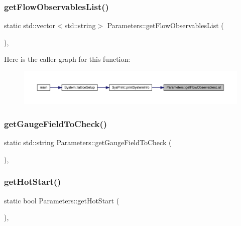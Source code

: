 \subsubsection{\texorpdfstring{getFlowObservablesList()}{getFlowObservablesList()}}
{\footnotesize\ttfamily static std\+::vector$<$std\+::string$>$ Parameters\+::get\+Flow\+Observables\+List (\begin{DoxyParamCaption}{ }\end{DoxyParamCaption})\hspace{0.3cm}{\ttfamily [inline]}, {\ttfamily [static]}}

Here is the caller graph for this function\+:
\nopagebreak
\begin{figure}[H]
\begin{center}
\leavevmode
\includegraphics[width=350pt]{class_parameters_a7f1edc3384a46b6e4fc5e380a8fe6d41_icgraph}
\end{center}
\end{figure}
\mbox{\label{class_parameters_ad6dea2bb6e91a1ca4fb5e20216b40039}} 
\subsubsection{\texorpdfstring{getGaugeFieldToCheck()}{getGaugeFieldToCheck()}}
{\footnotesize\ttfamily static std\+::string Parameters\+::get\+Gauge\+Field\+To\+Check (\begin{DoxyParamCaption}{ }\end{DoxyParamCaption})\hspace{0.3cm}{\ttfamily [inline]}, {\ttfamily [static]}}

\mbox{\label{class_parameters_a5ba21c056f0b7da17abcdd0a1eb2061f}} 
\subsubsection{\texorpdfstring{getHotStart()}{getHotStart()}}
{\footnotesize\ttfamily static bool Parameters\+::get\+Hot\+Start (\begin{DoxyParamCaption}{ }\end{DoxyParamCaption})\hspace{0.3cm}{\ttfamily [inline]}, {\ttfamily [static]}}

